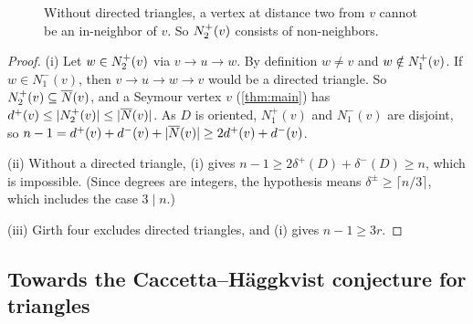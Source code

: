 \begin{figure}[ht]
\centering
{}
\caption{Without directed triangles, a vertex at distance two from $v$ cannot be
an in-neighbor of $v$. So $N^+_2(v)$ consists of non-neighbors.}
\label{fig:triangles}
\end{figure}

\begin{proof}
(i) Let $w\in N^+_2(v)$ via $v\to u\to w$. By definition $w\ne v$ and $w\notin N^+_1(v)$. If
$w\in N^-_1(v)$, then $v\to u\to w\to v$ would be a directed triangle. So
$N^+_2(v)\subseteq\overline N(v)$, and a Seymour vertex $v$ (\cref{thm:main}) has
$d^+(v)\le\lvert N^+_2(v)\rvert\le\lvert \overline N(v)\rvert$. As $D$ is oriented, $N^+_1(v)$ and $N^-_1(v)$
are disjoint, so $n-1=d^+(v)+d^-(v)+\lvert \overline N(v)\rvert\ge2d^+(v)+d^-(v)$.

(ii) Without a directed triangle, (i) gives $n-1\ge2\delta^+(D)+\delta^-(D)\ge n$, which is
impossible. (Since degrees are integers, the hypothesis means
$\delta^\pm\ge\lceil n/3\rceil$, which includes the case $3\mid n$.)

(iii) Girth four excludes directed triangles, and (i) gives $n-1\ge3r$.
\end{proof}

\subsection{Towards the Caccetta--H\"aggkvist conjecture for triangles}\label{sec:ch}


